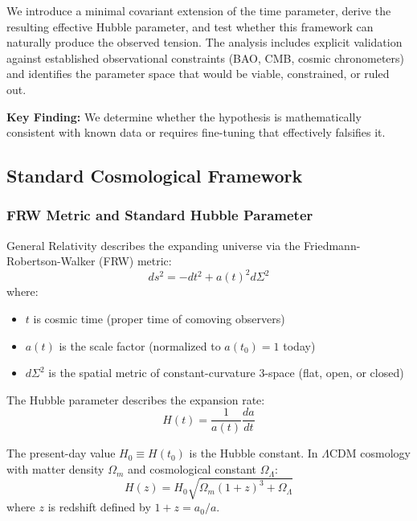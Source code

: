 We introduce a minimal covariant extension of the time parameter, derive the resulting effective Hubble parameter, and test whether this framework can naturally produce the observed tension. The analysis includes explicit validation against established observational constraints (BAO, CMB, cosmic chronometers) and identifies the parameter space that would be viable, constrained, or ruled out.

\textbf{Key Finding:} We determine whether the hypothesis is mathematically consistent with known data or requires fine-tuning that effectively falsifies it.

\subsection{Standard Cosmological Framework}

\subsubsection{FRW Metric and Standard Hubble Parameter}

General Relativity describes the expanding universe via the Friedmann-Robertson-Walker (FRW) metric:
\begin{equation}
ds^2 = -dt^2 + a(t)^2 d\Sigma^2
\label{eq:frw_metric}
\end{equation}
where:
\begin{itemize}
    \item $t$ is cosmic time (proper time of comoving observers)
    \item $a(t)$ is the scale factor (normalized to $a(t_0) = 1$ today)
    \item $d\Sigma^2$ is the spatial metric of constant-curvature 3-space (flat, open, or closed)
\end{itemize}

The Hubble parameter describes the expansion rate:
\begin{equation}
H(t) = \frac{1}{a(t)} \frac{da}{dt}
\label{eq:hubble_standard}
\end{equation}

The present-day value $H_0 \equiv H(t_0)$ is the Hubble constant. In $\Lambda$CDM cosmology with matter density $\Omega_m$ and cosmological constant $\Omega_\Lambda$:
\begin{equation}
H(z) = H_0 \sqrt{\Omega_m (1+z)^3 + \Omega_\Lambda}
\label{eq:hubble_lcdm}
\end{equation}
where $z$ is redshift defined by $1+z = a_0/a$.


